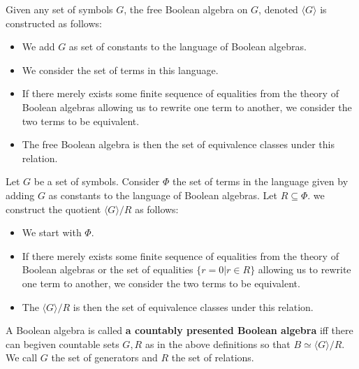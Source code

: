 \documentclass{../util/zariski-small}
\begin{document}
\begin{definition}
  Given any set of symbols $G$, the free Boolean algebra on $G$, denoted $\langle G \rangle$
  is constructed as follows:
  \begin{itemize}
    \item We add $G$ as set of constants to the language of Boolean algebras. 
    \item We consider the set of terms in this language. 
    \item If there merely exists some finite sequence of 
      equalities from the theory of Boolean algebras allowing us to rewrite one term to another, 
      we consider the two terms to be equivalent. 
    \item The free Boolean algebra is then the set of equivalence classes under this relation. 
  \end{itemize}
\end{definition}
\begin{definition}
  Let $G$ be a set of symbols. Consider $\Phi$ the set of terms in the language 
  given by adding $G$ as constants to the language of Boolean algebras. 
  Let $R \subseteq \Phi$. 
  we construct the quotient $\langle G \rangle / R$ as follows:
  \begin{itemize}
    \item We start with $\Phi$. 
    \item If there merely exists some finite sequence of 
      equalities from the theory of Boolean algebras or the set of equalities $\{r = 0 | r \in R\}$ 
      allowing us to rewrite one term to another, we consider the two terms to be equivalent. 
    \item The $\langle G \rangle / R$ is then the set of equivalence classes under this relation. 
  \end{itemize}
\end{definition}
\begin{definition}
  A Boolean algebra is called \textbf{a countably presented Boolean algebra} iff there 
  can begiven countable sets $G,R$ as in the above definitions so that $B \simeq \langle G\rangle / R$. 
  We call $G$ the set of generators and $R$ the set of relations. 
\end{definition}
\end{document}
